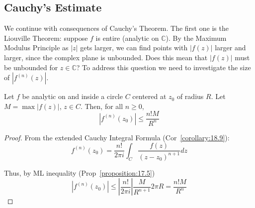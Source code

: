 
% 
% 
% 
% 
% 
% 
% 
% 
% 
% 
% 

\graphicspath{{./input/graphs/note11/}}



% 



\subsection{Cauchy's Estimate}


We continue with consequences of Cauchy's Theorem. The first one is the Liouville Theorem: suppose $f$ is entire (analytic on $\mathbb{C}$). By the Maximum Modulus Principle as $|z|$ gets larger, 
we can find points with $|f(z)|$ larger and larger, since the complex plane is unbounded. Does this mean that $|f(z)|$ must be unbounded for $z \in \mathbb{C}$? 
To address this question we need to investigate the size of $|f^{(n)}(z)|$.
\begin{proposition}\label{proposition:20.3}
     Let $f$ be analytic on and inside a circle $C$ centered at $z_0$ of radius $R$. Let $M = \max |f(z)|$, $z \in C$. Then, for all $n \ge 0$,
    \[
        |f^{(n)}(z_0)| \le \frac{n! M}{R^n}
        \]
    \end{proposition}
\begin{proof}
From the extended Cauchy Integral Formula (Cor~\ref{corollary:18.9}):
\[
        f^{(n)}(z_0) = \frac{n!}{2\pi i} \int_C \frac{f(z)}{(z-z_0)^{n+1}} dz
  \]
        
        Thus, by ML inequality (Prop~\ref{proposition:17.5})
        \[
            |f^{(n)}(z_0)| \le \left| \frac{n!}{2\pi i} \right| \frac{M}{R^{n+1}} 2\pi R = \frac{n! M}{R^n}
  \]
\end{proof}

